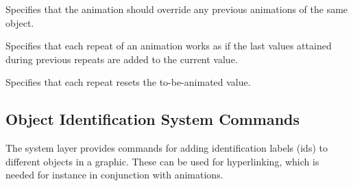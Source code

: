 \begin{command}{\pgfsys@animation@replace{}}
  Specifies that the animation should override any previous animations
  of the same object. 
\begin{codeexample}[width=2cm]
\end{codeexample}
\end{command}

\begin{command}{\pgfsys@animation@accumulate{}}
  Specifies that each repeat of an animation works as if the last
  values attained during previous repeats are added to the current value.
\begin{codeexample}[width=2cm]
\end{codeexample}
\end{command}

\begin{command}{\pgfsys@animation@noaccumulate{}}
  Specifies that each repeat resets the to-be-animated value.
\begin{codeexample}[width=2cm]
\end{codeexample}
\end{command}






\subsection{Object Identification System Commands}
\label{section-sys-id}

The system layer provides commands for adding identification labels
(ids) to different objects in a graphic. These can be used for
hyperlinking, which is needed for instance in conjunction with
animations.

